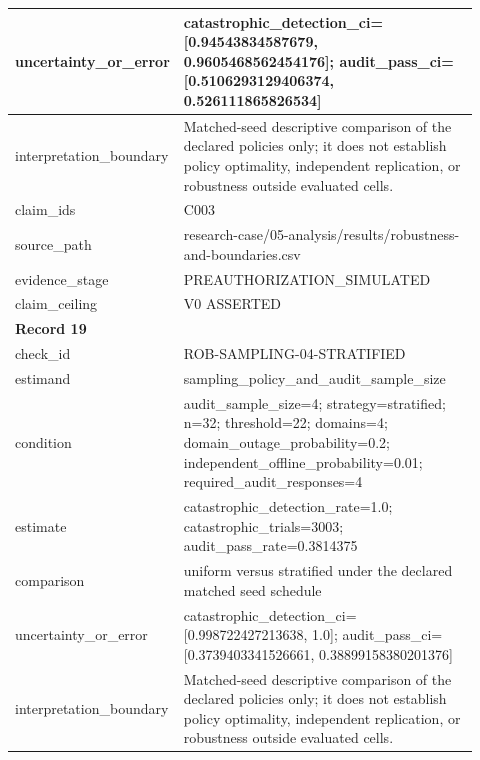 \begin{longtable}{|p{0.24\linewidth}|p{0.68\linewidth}|}
uncertainty\_\allowbreak{}or\_\allowbreak{}error & catastrophic\_\allowbreak{}detection\_\allowbreak{}ci=[0.94543834587679, 0.9605468562454176];\allowbreak{} audit\_\allowbreak{}pass\_\allowbreak{}ci=[0.5106293129406374, 0.526111865826534] \\ \hline
interpretation\_\allowbreak{}boundary & Matched-seed descriptive comparison of the declared policies only;\allowbreak{} it does not establish policy optimality, independent replication, or robustness outside evaluated cells. \\ \hline
claim\_\allowbreak{}ids & C003 \\ \hline
source\_\allowbreak{}path & research-case/05-analysis/results/robustness-and-boundaries.csv \\ \hline
evidence\_\allowbreak{}stage & PREAUTHORIZATION\_\allowbreak{}SIMULATED \\ \hline
claim\_\allowbreak{}ceiling & V0 ASSERTED \\ \hline
\multicolumn{2}{|l|}{\textbf{Record 19}} \\ \hline
check\_\allowbreak{}id & ROB-SAMPLING-04-STRATIFIED \\ \hline
estimand & sampling\_\allowbreak{}policy\_\allowbreak{}and\_\allowbreak{}audit\_\allowbreak{}sample\_\allowbreak{}size \\ \hline
condition & audit\_\allowbreak{}sample\_\allowbreak{}size=4;\allowbreak{} strategy=stratified;\allowbreak{} n=32;\allowbreak{} threshold=22;\allowbreak{} domains=4;\allowbreak{} domain\_\allowbreak{}outage\_\allowbreak{}probability=0.2;\allowbreak{} independent\_\allowbreak{}offline\_\allowbreak{}probability=0.01;\allowbreak{} required\_\allowbreak{}audit\_\allowbreak{}responses=4 \\ \hline
estimate & catastrophic\_\allowbreak{}detection\_\allowbreak{}rate=1.0;\allowbreak{} catastrophic\_\allowbreak{}trials=3003;\allowbreak{} audit\_\allowbreak{}pass\_\allowbreak{}rate=0.3814375 \\ \hline
comparison & uniform versus stratified under the declared matched seed schedule \\ \hline
uncertainty\_\allowbreak{}or\_\allowbreak{}error & catastrophic\_\allowbreak{}detection\_\allowbreak{}ci=[0.998722427213638, 1.0];\allowbreak{} audit\_\allowbreak{}pass\_\allowbreak{}ci=[0.3739403341526661, 0.38899158380201376] \\ \hline
interpretation\_\allowbreak{}boundary & Matched-seed descriptive comparison of the declared policies only;\allowbreak{} it does not establish policy optimality, independent replication, or robustness outside evaluated cells. \\ \hline

\end{longtable}
